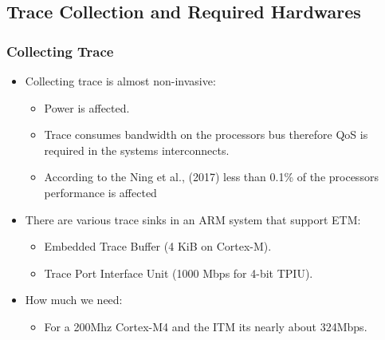 \documentclass{beamer}
\begin{document}
\subsection{Trace Collection and Required Hardwares}
\begin{frame}
    \frametitle{Collecting Trace}
    \begin{itemize}
        \item Collecting trace is almost non-invasive: \cite{arm2020embedded}
            \begin{itemize}
                \item Power is affected.
                \item Trace consumes bandwidth on the processors bus therefore
                    QoS is required in the systems interconnects.
                \item According to the Ning et al., (2017)\cite{ning2017ninja} less than 0.1\% of the
                    processors performance is affected
            \end{itemize}
        \item There are various trace sinks in an ARM system that support ETM:
            \begin{itemize}
                \item Embedded Trace Buffer (4 KiB on Cortex-M).
                \item Trace Port Interface Unit (1000 Mbps for 4-bit TPIU).
            \end{itemize}
        \item How much we need:
            \begin{itemize}
                \item For a 200Mhz Cortex-M4 and the ITM its nearly about 324Mbps.
            \end{itemize}
    \end{itemize}
\end{frame}
\end{document}
